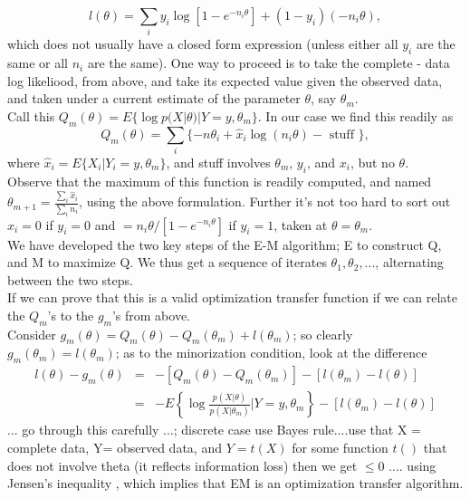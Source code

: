 \documentclass[11pt,a4paper]{article}
\begin{document}
$$l(\theta)=\sum_i y_i\log[ 1 - e^{-n_i \theta} ]  + (1-y_i)(-n_i \theta) ,$$
which does not usually have a closed form expression (unless either all $y_i$ are the same or all $n_i$ are the same).  One way to proceed is to take the complete - data log likeliood, from above, and take its expected value given the observed data, and taken under a current estimate of the parameter $\theta$, say $\theta_m$.\\
Call this $Q_m(\theta) = E\{ \log p(X|\theta) | Y=y , \theta_m \}$. In our case we find this readily as
$$Q_m(\theta) = \sum_i\{ -n \theta_i + \hat{x}_i  \log( n_i \theta) - \text{ stuff }\},$$   where $\hat{x}_i = E\{ X_i | Y_i=y, \theta_m \}$, and stuff involves $\theta_m$, $y_i$, and $x_i$, but no $\theta$.\\
Observe that the maximum of this function is readily computed, and named  $\theta_{m+1} = \frac{\sum_i \hat{x}_i }{\sum_i n_i}$, using the above formulation.  Further it's not too hard to sort out $\hat{x}_i = 0$ if $y_i = 0$ and $= n_i \theta/[1 - e^{-n_i \theta}] $ if $y_i = 1$, taken at $\theta = \theta_m$.\\
We have developed the two key steps of the E-M algorithm; E to construct Q, and M to maximize Q.   We thus get a sequence of iterates $\theta_1, \theta_2, ...$, alternating between the two steps.\\
If we can prove that this is a valid optimization transfer function if we can relate the $Q_m$'s to the $g_m$'s from above.\\
Consider   $g_m( \theta ) = Q_m(\theta) - Q_m( \theta_m ) + l(\theta_m)$; so clearly $g_m(\theta_m) = l( \theta_m )$; as to the minorization condition, look at the difference
\begin{eqnarray*}
l(\theta ) - g_m(\theta)&=&  -[Q_m(\theta) - Q_m(\theta_m) ] - [l(\theta_m) -l(\theta)] \\
&=& - E\left\{\log \frac{p( X |\theta )}{p(X|\theta_m )}| Y=y ,\theta_m \right\}-[l(\theta_m) - l(\theta) ] 
\end{eqnarray*}
... go through this carefully ...; discrete case use Bayes rule....use that X = complete data, Y= observed data, and $Y = t(X)$ for some function $t()$ that does not involve theta (it reflects information loss) then we get  $\leq 0$   .... using Jensen's inequality , which implies that EM is an optimization transfer algorithm.
\end{document}
